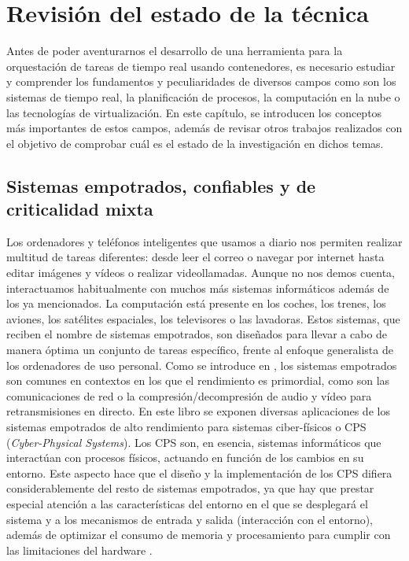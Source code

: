 \chapter{Revisión del estado de la técnica}
\label{ch:02-state_of_the_art}

Antes de poder aventurarnos el desarrollo de una herramienta para la
orquestación de tareas de tiempo real usando contenedores, es necesario
estudiar y comprender los fundamentos y peculiaridades de diversos campos como
son los sistemas de tiempo real, la planificación de procesos, la computación en
la nube o las tecnologías de virtualización. En este capítulo, se introducen los
conceptos más importantes de estos campos, además de revisar otros trabajos
realizados con el objetivo de comprobar cuál es el estado de la investigación
en dichos temas.

\section{Sistemas empotrados, confiables y de criticalidad mixta}

Los ordenadores y teléfonos inteligentes que usamos a diario nos permiten
realizar multitud de tareas diferentes: desde leer el correo o navegar por
internet hasta editar imágenes y vídeos o realizar videollamadas. Aunque no nos
demos cuenta, interactuamos habitualmente con muchos más sistemas informáticos
además de los ya mencionados. La computación está presente en los coches, los
trenes, los aviones, los satélites espaciales, los televisores o las lavadoras.
Estos sistemas, que reciben el nombre de sistemas empotrados, son diseñados para
llevar a cabo de manera óptima un conjunto de tareas específico, frente al
enfoque generalista de los ordenadores de uso personal. Como se introduce en
\cite{wolf_high-performance_2014}, los sistemas empotrados son comunes en
contextos en los que el rendimiento es primordial, como son las comunicaciones
de red o la compresión/decompresión de audio y vídeo para retransmisiones en
directo. En este libro se exponen diversas aplicaciones de los sistemas
empotrados de alto rendimiento para sistemas ciber-físicos o CPS
(\textit{Cyber-Physical Systems}). Los CPS son, en esencia, sistemas
informáticos que interactúan con procesos físicos, actuando en función de los
cambios en su entorno. Este aspecto hace que el diseño y la implementación de
los CPS difiera considerablemente del resto de sistemas empotrados, ya que hay
que prestar especial atención a las características del entorno en el que se
desplegará el sistema y a los mecanismos de entrada y salida (interacción con el
entorno), además de optimizar el consumo de memoria y procesamiento para cumplir
con las limitaciones del hardware \cite{lee_introduction_2016}.

